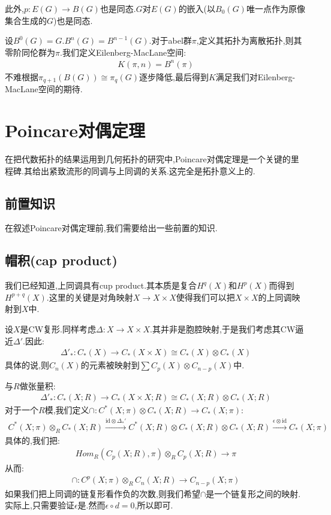 此外,$p:E(G) \to B(G)$也是同态.$G$对$E(G)$的嵌入(以$B_0(G)$唯一点作为原像集合生成的$G$)也是同态.

\begin{definition}
    设$B^0(G)=G$.$B^n(G)=B^{n-1}(G)$.对于abel群$\pi$,定义其拓扑为离散拓扑,则其零阶同伦群为$\pi$.我们定义Eilenberg-MacLane空间:
    \begin{align*}
        K(\pi,n)=B^n(\pi)
    \end{align*}
    不难根据$\pi_{q+1}(B(G)) \cong \pi_q(G)$逐步降低,最后得到$K$满足我们对Eilenberg-MacLane空间的期待.
\end{definition}
\chapter{Poincare对偶定理}
在把代数拓扑的结果运用到几何拓扑的研究中,Poincare对偶定理是一个关键的里程碑.其给出紧致流形的同调与上同调的关系.这完全是拓扑意义上的.
\section{前置知识}
在叙述Poincare对偶定理前,我们需要给出一些前置的知识.
\section{帽积(cap product)}
我们已经知道,上同调具有cup product.其本质是复合$H^q(X)$和$H^{p}(X)$而得到$H^{p+q}(X)$.这里的关键是对角映射$X \to X\times X$使得我们可以把$X \times X$的上同调映射到$X$中.

设$X$是CW复形.同样考虑$\Delta:X \to X \times X$.其并非是胞腔映射,于是我们考虑其CW逼近$\Delta'$.因此:
\begin{align*}
    \Delta'_*: C_*(X) \to C_*(X \times X) \cong C_*(X) \otimes C_*(X)
\end{align*}
具体的说,则$C_n(X)$的元素被映射到$\sum C_p(X) \otimes C_{n-p}(X)$中.

与$R$做张量积:
\begin{align*}
    \Delta'_*: C_*(X;R) \to C_*(X \times X;R) \cong C_*(X;R) \otimes C_*(X;R)
\end{align*}
对于一个$R$模,我们定义$\cap:C^*(X;\pi)\otimes C_*(X;R) \to C_*(X;\pi)$:
\begin{align*}
    C^*(X;\pi) \otimes_R C_*(X;R) \stackrel{\mathrm{id}\otimes \Delta_*'}{\longrightarrow}C^*(X;R)\otimes C_*(X;R) \otimes C_*(X;R) \stackrel{\epsilon \otimes \mathrm{id}}{\longrightarrow}C_*(X;\pi)
\end{align*}
具体的,我们把:
\begin{align*}
    Hom_R(C_p(X;R),\pi)\otimes_R C_p(X;R) \to \pi
\end{align*}
从而:
\begin{align*}
    \cap:C^p(X;\pi) \otimes_R C_n(X;R) \longrightarrow C_{n-p}(X;\pi)
\end{align*}
如果我们把上同调的链复形看作负的次数,则我们希望$\cap$是一个链复形之间的映射.实际上,只需要验证$\epsilon$是.然而$\epsilon \circ d=0$,所以即可.

